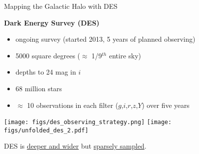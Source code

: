 \documentclass[12pt]{beamer}
\newcommand{\todo}[1]{{\color{red}TODO: #1}}
\newcommand{\att}[1]{\begin{textblock*}{12cm}(0.5cm,9cm) %
  {\tiny Source: #1}
      \end{textblock*}}
\begin{document}










\begin{frame}{Mapping the Galactic Halo with DES}

\textbf{Dark Energy Survey (DES)}
\begin{itemize}
\item ongoing survey (started 2013, 5 years of planned observing)
\item 5000 square degrees ($\approx$ 1/9$^{th}$ entire sky)
\item depths to 24 mag in $i$
\item 68 million stars
\item $\approx$ 10 observations in each filter ($g$,$i$,$r$,$z$,$Y$) over five years
\end{itemize}

\vspace{.1in}
\texttt{[image: figs/des\_observing\_strategy.png]}
\texttt{[image: figs/unfolded\_des\_2.pdf]}

\vspace{.1in}

\begin{center}
  DES is \underline{deeper and wider} but \underline{sparsely sampled}.
\end{center}

\end{frame}
\end{document}
